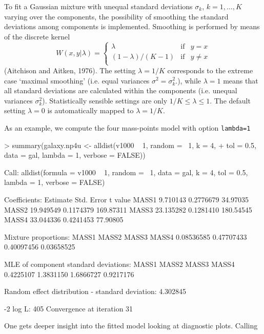 \documentclass[a4paper]{article}
\begin{document}
\begin{landscape}
To fit a Gaussian mixture with unequal standard deviations $\sigma_k$, $k=1, \ldots, K$ varying over the components, the possibility of smoothing the standard 
deviations among components is implemented. Smoothing is performed by means of the discrete kernel
\[
W(x,y|\lambda)=\left\{\begin{array}{lcc}\lambda &\mbox{if}  & y=x\\
                                        (1-\lambda)/(K-1)   &\mbox{if}  &y \not= x\\
                       \end{array}\right.
                        \]
(Aitchison and Aitken, 1976). The setting $\lambda=1/K$  corresponds to the extreme case `maximal smoothing' (i.e. equal 
variances $\sigma^2=\sigma^2_k$.), while $\lambda = 1$ means that all standard deviations are calculated within the
    components (i.e. unequal variances $\sigma^2_k$).   Statistically sensible settings are only
    $1/K \le  \lambda  \le 1$.  The default setting $\lambda= 0$ is automatically mapped to 
$\lambda =1/K$.  

 As an example, we compute the four  mass-points model with option {\tt lambda=1}
\begin{Schunk}
\begin{Sinput}
> summary(galaxy.np4u <- alldist(v1000 ~ 1, random = ~1, k = 4, 
+     tol = 0.5, data = gal, lambda = 1, verbose = FALSE))
\end{Sinput}
\begin{Soutput}
Call:  alldist(formula = v1000 ~ 1, random = ~1, data = gal, k = 4,      tol = 0.5, lambda = 1, verbose = FALSE) 

Coefficients:
       Estimate Std. Error   t value
MASS1  9.710143  0.2776679  34.97035
MASS2 19.949549  0.1174379 169.87311
MASS3 23.135282  0.1281410 180.54545
MASS4 33.044336  0.4241453  77.90805

Mixture proportions:
     MASS1       MASS2       MASS3       MASS4  
0.08536585  0.47707433  0.40097456  0.03658525  

MLE of component standard deviations:
    MASS1      MASS2      MASS3      MASS4  
0.4225107  1.3831150  1.6866727  0.9217176  

Random effect distribution - standard deviation:	   4.302845 

-2 log L:	    405     Convergence at iteration  31
\end{Soutput}
\end{Schunk}

One gets deeper insight into the fitted model looking at diagnostic plots. Calling


\end{landscape}
\end{document}
